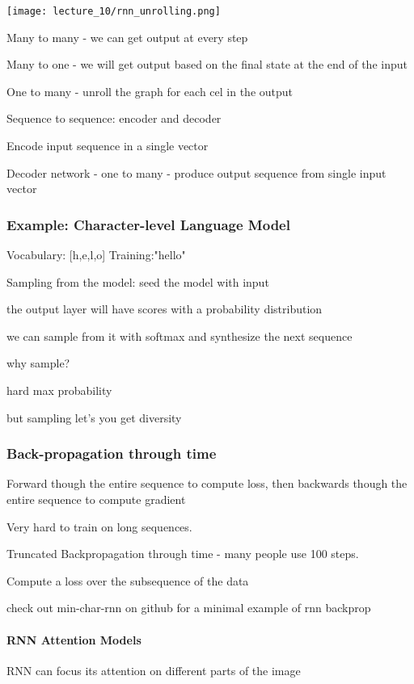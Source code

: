 \texttt{[image: lecture\_10/rnn\_unrolling.png]}

Many to many - we can get output at every step

Many to one - we will get output based on the final state at the end of the input

One to many - unroll the graph for each cel in the output

Sequence to sequence: encoder and decoder

Encode input sequence in a single vector

Decoder network - one to many - produce output sequence from single input vector

\subsubsection{Example: Character-level Language Model}

Vocabulary: [h,e,l,o]
Training:"hello"

Sampling from the model: seed the model with input

the output layer will have scores with a probability distribution

we can sample from it with softmax and synthesize the next sequence

why sample? 

hard max probability

but sampling let's you get diversity

\subsubsection{Back-propagation through time}

Forward though the entire sequence to compute loss, then backwards though the entire sequence to compute gradient

Very hard to train on long sequences.

Truncated Backpropagation through time - many people use 100 steps. 

Compute a loss over the subsequence of the data

check out min-char-rnn on github for a minimal example of rnn backprop

\paragraph{RNN Attention Models}

RNN can focus its attention on different parts of the image

